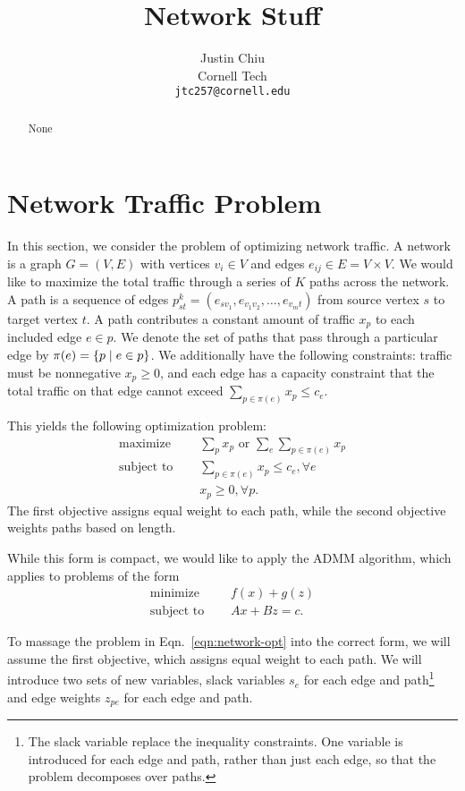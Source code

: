 \documentclass[11pt]{article}
\title{Network Stuff}
\author{Justin Chiu \\
  Cornell Tech \\
  \texttt{jtc257@cornell.edu}}
\begin{document}
\maketitle
\begin{abstract}
None
\end{abstract}

\section{Network Traffic Problem}
In this section, we consider the problem of optimizing network traffic.
A network is a graph $G = (V,E)$ with vertices $v_i\in V$ and edges
$e_{ij}\in E = V\times V$.
We would like to maximize the total traffic through a series of $K$ paths across the network.
A path is a sequence of edges $p_{st}^k = (e_{sv_1},e_{v_1v_2},\ldots,e_{v_mt})$
from source vertex $s$ to target vertex $t$.
A path contributes a constant amount of traffic $x_p$ to each included edge $e\in p$.
We denote the set of paths that pass through a particular edge by
$\pi(e) = \left\{p \mid e \in p\right\}$.
We additionally have the following constraints: traffic must be nonnegative $x_p \geq 0$,
and each edge has a capacity constraint that the total traffic on that
edge cannot exceed $\sum_{p\in\pi(e)} x_p \le c_e$.

This yields the following optimization problem:
\begin{equation}
\label{eqn:network-opt}
\begin{aligned}
\textrm{maximize } \quad & \sum_{p} x_p \textrm{ or } \sum_{e} \sum_{p\in\pi(e)}x_{p}\\
\textrm{subject to } \quad &\sum_{p\in\pi(e)}x_p \le c_e, \forall e\\
& x_p \geq 0, \forall p.
\end{aligned}
\end{equation}
The first objective assigns equal weight to each path, while the second
objective weights paths based on length.

While this form is compact, we would like to apply the ADMM algorithm,
which applies to problems of the form
\begin{equation}
\label{eqn:admm}
\begin{aligned}
\textrm{minimize } \quad & f(x) + g(z)\\
\textrm{subject to } \quad & Ax + Bz = c.
\end{aligned}
\end{equation}

To massage the problem in Eqn.~\ref{eqn:network-opt} into the correct form,
we will assume the first objective, which assigns equal weight to each path.
We will introduce two sets of new variables, slack variables $s_e$ for each edge and path\footnote{
The slack variable replace the inequality constraints.
One variable is introduced for each edge and path, rather than just each edge,
so that the problem decomposes over paths.
}
and edge weights $z_{pe}$ for each edge and path.
\end{document}
